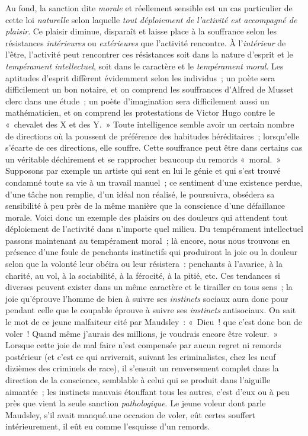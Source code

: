 \documentclass[french,twoside]{book} %
\begin{document}
Au fond, la sanction dite \emph{morale} et réellement sensible est un cas particulier de cette loi \emph{naturelle} selon laquelle \emph{tout déploiement de l’activité est accompagné de plaisir}. Ce plaisir diminue, disparaît et laisse place à la souffrance selon les résistances \emph{intérieures} ou \emph{extérieures} que l’activité rencontre. À l’\emph{intérieur} de l’être, l’activité peut rencontrer ces résistances soit dans la nature d’esprit et le \emph{tempérament intellectuel}, soit dans le caractère et le \emph{tempérament moral}. Les aptitudes d’esprit diffèrent évidemment selon les individus ; un poète sera difficilement un bon notaire, et on comprend les souffrances d’Alfred de Musset clerc dans une étude ; un poète d’imagination sera difficilement aussi un mathématicien, et on comprend les protestations de Victor Hugo contre le « chevalet des X et des Y. » Toute intelligence semble avoir un certain nombre de directions où la poussent de préférence des habitudes héréditaires ; lorsqu’elle s’écarte de ces directions, elle souffre. Cette souffrance peut être dans certains cas un véritable déchirement et se rapprocher beaucoup du remords « moral. » Supposons par exemple un artiste qui sent en lui le génie et qui s’est trouvé condamné toute sa vie à un travail manuel ; ce sentiment d’une existence perdue, d’une tâche non remplie, d’un idéal non réalisé, le poursuivra, obsédera sa sensibilité à peu près de la même manière que la conscience d’une défaillance morale. Voici donc un exemple des plaisirs ou des douleurs qui attendent tout déploiement de l’activité dans n’importe quel milieu. Du tempérament intellectuel passons maintenant au tempérament moral ; là encore, nous nous trouvons en présence d’une foule de penchants instinctifs qui produiront la joie ou la douleur selon que la volonté leur obéira ou leur résistera : penchants à l’avarice, à la charité, au vol, à la sociabilité, à la férocité, à la pitié, etc. Ces tendances si diverses peuvent exister dans un même caractère et le tirailler en tous sens ; la joie qu’éprouve l’homme de bien à suivre ses \emph{instincts} sociaux aura donc pour pendant celle que le coupable éprouve à suivre ses \emph{instincts} antisociaux. On sait le mot de ce jeune malfaiteur cité par Maudsley : « Dieu ! que c’est donc bon de voler ! Quand même j’aurais des millions, je voudrais encore être voleur. » Lorsque cette joie de mal faire n’est compensée par aucun regret ni remords postérieur (et c’est ce qui arriverait, suivant les criminalistes, chez les neuf dizièmes des criminels de race), il s’ensuit un renversement complet dans la direction de la conscience, semblable à celui qui se produit dans l’aiguille aimantée ; les instincts mauvais étouffant tous les autres, c’est d’eux ou à peu près que vient la seule sanction \emph{pathologique}. Le jeune voleur dont parle Maudsley, s’il avait manqué.une occasion de voler, eût certes souffert intérieurement, il eût eu comme l’esquisse d’un remords.\par
\end{document}
